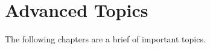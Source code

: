 \section{Advanced Topics}
\label{sec:Advanced-Topics}
The following chapters are a brief of important topics.
